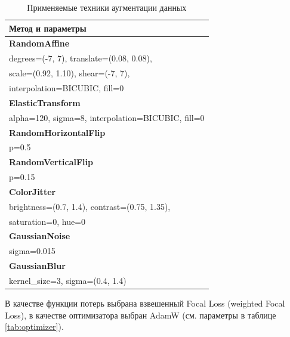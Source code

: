\documentclass[eqsecnum, authorsinfo]{kioj6}
\begin{document}
\begin{table}[htbp]
    \centering
    \caption{Применяемые техники аугментации данных}
    \label{tab:augmentation}
    \renewcommand{\arraystretch}{1.2}
    \begin{tabularx}{\textwidth}{>{\ttfamily\footnotesize\raggedright\arraybackslash}X}
        \toprule
        \textnormal{\textbf{Метод и параметры}} \\
        \midrule
        \textnormal{\textbf{RandomAffine}} \\
        \quad degrees=(-7, 7), translate=(0.08, 0.08), \\
        \quad scale=(0.92, 1.10), shear=(-7, 7), \\ 
        \quad interpolation=BICUBIC, fill=0 \\
        \addlinespace
        
        \textnormal{\textbf{ElasticTransform}} \\
        \quad alpha=120, sigma=8, interpolation=BICUBIC, fill=0 \\
        \addlinespace
        
        \textnormal{\textbf{RandomHorizontalFlip}} \\
        \quad p=0.5 \\
        \addlinespace
        
        \textnormal{\textbf{RandomVerticalFlip}} \\
        \quad p=0.15 \\
        \addlinespace
        
        \textnormal{\textbf{ColorJitter}} \\
        \quad brightness=(0.7, 1.4), contrast=(0.75, 1.35), \\
        \quad saturation=0, hue=0 \\
        \addlinespace
        
        \textnormal{\textbf{GaussianNoise}} \\
        \quad sigma=0.015 \\
        \addlinespace
        
        \textnormal{\textbf{GaussianBlur}} \\
        \quad kernel\_size=3, sigma=(0.4, 1.4) \\
        \bottomrule
    \end{tabularx}
\end{table}

В качестве функции потерь выбрана взвешенный Focal Loss (weighted Focal Loss), в качестве оптимизатора выбран AdamW \cite{loshchilov2019decoupledweightdecayregularization} (см. параметры в таблице \ref{tab:optimizer}).
\end{document}
